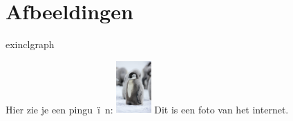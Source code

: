 \documentclass[presentatie.tex]{subfiles}
\begin{document}
\section{Afbeeldingen}

\clearrecentlist



\begin{saveblock}{exinclgraph}
	\begin{highlightblock}[linewidth=0.95\textwidth,framexleftmargin=0.25em]
		Hier zie je een pingu~\"i~n:
		\includegraphics[height=2cm]{pinguin.jpg}
		Dit is een foto van het internet.
	\end{highlightblock}
\end{saveblock}

\newcommand\penExCode[2][2.5cm]{%
	\adjustbox{%
		raise={-\height},set height=0cm,set depth=#1}{%
			\adjustbox{
				max totalheight=#1,
			}{%
				\useblock{#2}%
			}%
	}
	\par%
	{\hspace{0.075\textwidth}\textcolor{red!30!white}{\rule{0.8\textwidth}{1px}}}\par
	\vspace{-\baselineskip}\vspace{0.3\baselineskip}%
}
\end{document}
